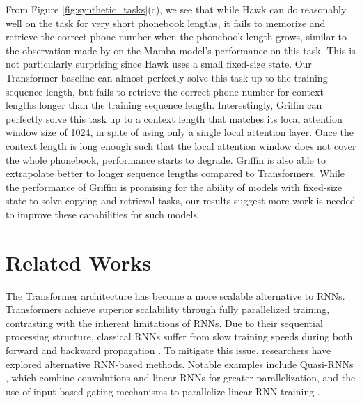 \documentclass[11pt, a4paper, logo, onecolumn]{googledeepmind}
\theoremstyle{definition}
\begin{document}
From Figure \ref{fig:synthetic_tasks}(c), we see that while Hawk can do reasonably well on the task for very short phonebook lengths, it fails to memorize and retrieve the correct phone number when the phonebook length grows, similar to the observation made by \citet{jelassi2024repeat} on the Mamba model's performance on this task. This is not particularly surprising since Hawk uses a small fixed-size state. Our Transformer baseline can almost perfectly solve this task up to the training sequence length, but fails to retrieve the correct phone number for context lengths longer than the training sequence length. Interestingly, Griffin can perfectly solve this task up to a context length that matches its local attention window size of 1024, in spite of using only a single local attention layer. Once the context length is long enough such that the local attention window does not cover the whole phonebook, performance starts to degrade. Griffin is also able to extrapolate better to longer sequence lengths compared to Transformers. 
While the performance of Griffin is promising for the ability of models with fixed-size state to solve copying and retrieval tasks, our results suggest more work is needed to improve these  capabilities for such models.

\section{Related Works}



The Transformer architecture has become a more scalable alternative to RNNs. 
Transformers achieve superior scalability through fully parallelized training, contrasting with the inherent limitations of RNNs. 
Due to their sequential processing structure, classical RNNs suffer from slow training speeds during both forward and backward propagation \citep{werbos1990backpropagation}. 
To mitigate this issue, researchers have explored alternative RNN-based methods. 
Notable examples include Quasi-RNNs \citep{bradbury2016quasi}, which combine convolutions and linear RNNs for greater parallelization, and the use of input-based gating mechanisms to parallelize linear RNN training \citep{martin2017parallelizing}.
\end{document}
